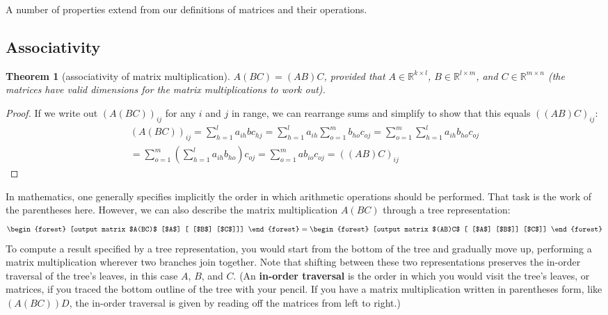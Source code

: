 \documentclass[draft,12pt]{report}
\newtheorem{theorem}{Theorem}
\begin{document}
A number of properties extend from our definitions of matrices and their operations.

\subsection{Associativity}

\begin{theorem}[associativity of matrix multiplication]
    $A(BC) = (AB)C$, provided that $A \in \mathbb R^{k \times l}$, $B \in \mathbb R^{l \times m}$, and $C \in \mathbb R^{m \times n}$ (the matrices have valid dimensions for the matrix multiplications to work out).
\end{theorem}
\begin{proof}
    If we write out $(A(BC))_{ij}$ for any $i$ and $j$ in range, we can rearrange sums and simplify to show that this equals $((AB)C)_{ij}$:
    \begin{multline*}
        (A(BC))_{ij} = \sum_{h = 1}^l a_{ih} bc_{hj} = \sum_{h = 1}^l a_{ih} \sum_{o = 1}^m b_{ho} c_{oj} = \sum_{o = 1}^m \sum_{h = 1}^l a_{ih} b_{ho} c_{oj} \\
        = \sum_{o = 1}^m \left( \sum_{h = 1}^l a_{ih} b_{ho} \right) c_{oj} = \sum_{o = 1}^m ab_{io} c_{oj} = ((AB)C)_{ij}
    \end{multline*}
\end{proof}

In mathematics, one generally specifies implicitly the order in which arithmetic operations should be performed. That task is the work of the parentheses here. However, we can also describe the matrix multiplication $A(BC)$ through a tree representation:
\[ \begin{forest}
    [output matrix $A(BC)$
        [$A$]
        [
            [$B$]
            [$C$]]]
\end{forest} = \begin{forest}
    [output matrix $(AB)C$
        [
            [$A$]
            [$B$]]
        [$C$]]
\end{forest} \]
To compute a result specified by a tree representation, you would start from the bottom of the tree and gradually move up, performing a matrix multiplication wherever two branches join together. Note that shifting between these two representations preserves the in-order traversal of the tree's leaves, in this case $A$, $B$, and $C$. (An \textbf{in-order traversal} is the order in which you would visit the tree's leaves, or matrices, if you traced the bottom outline of the tree with your pencil. If you have a matrix multiplication written in parentheses form, like $(A(BC))D$, the in-order traversal is given by reading off the matrices from left to right.)
\end{document}
